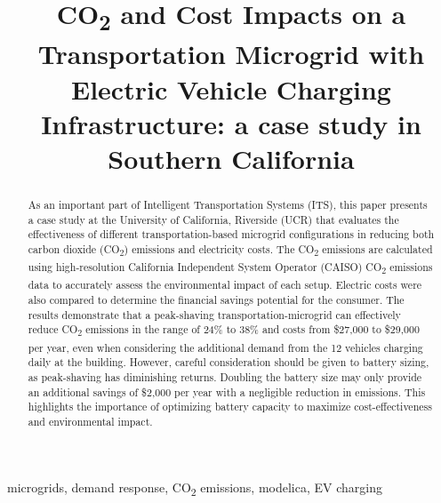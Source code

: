 \documentclass[conference]{IEEEtran}
\begin{document}
\title{CO\textsubscript{2} and Cost Impacts on a Transportation Microgrid with Electric Vehicle Charging Infrastructure: a case study in Southern California}

\author{
}
\maketitle

\begin{abstract}
	As an important part of Intelligent Transportation Systems (ITS), this paper presents a case study at the University of California, Riverside (UCR) that evaluates the effectiveness of different transportation-based microgrid configurations in reducing both carbon dioxide (CO\textsubscript{2}) emissions and electricity costs. The CO\textsubscript{2} emissions are calculated using high-resolution California Independent System Operator (CAISO) CO\textsubscript{2} emissions data to accurately assess the environmental impact of each setup. Electric costs were also compared to determine the financial savings potential for the consumer. The results demonstrate that a peak-shaving transportation-microgrid can effectively reduce CO\textsubscript{2} emissions in the range of 24\% to 38\% and costs from \$27,000 to \$29,000 per year, even when considering the additional demand from the 12 vehicles charging daily at the building. However, careful consideration should be given to battery sizing, as peak-shaving has diminishing returns. Doubling the battery size may only provide an additional savings of \$2,000 per year with a negligible reduction in emissions. This highlights the importance of optimizing battery capacity to maximize cost-effectiveness and environmental impact.
\end{abstract}
\begin{IEEEkeywords}
microgrids, demand response, CO\textsubscript{2} emissions, modelica, EV charging
\end{IEEEkeywords}
\end{document}
